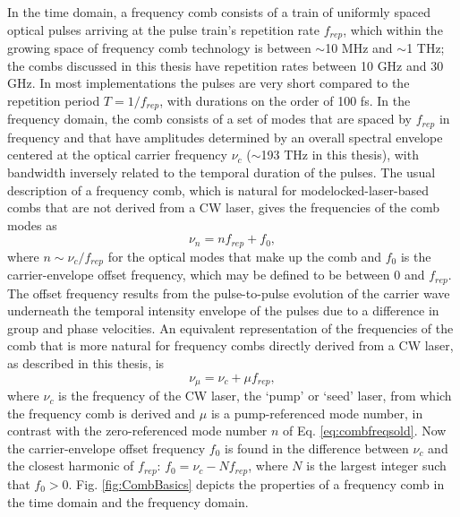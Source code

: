 In the time domain, a frequency comb consists of a train of uniformly spaced optical pulses arriving at the pulse train's repetition rate $f_{rep}$, which within the growing space of frequency comb technology is between $\sim$10 MHz and $\sim$1 THz; the combs discussed in this thesis have repetition rates between 10 GHz and 30 GHz. In most implementations the pulses are very short compared to the repetition period $T=1/f_{rep}$, with durations on the order of 100 fs. In the frequency domain, the comb consists of a set of modes that are spaced by $f_{rep}$ in frequency and that have amplitudes determined by an overall spectral envelope centered at the optical carrier frequency $\nu_c$ ($\sim$193 THz in this thesis), with bandwidth inversely related to the temporal duration of the pulses. The usual description of a frequency comb, which is natural for modelocked-laser-based combs that are not derived from a CW laser, gives the frequencies of the comb modes as 
\begin{equation}
\nu_n=nf_{rep}+f_0, \label{eq:combfreqsold}
\end{equation} 
where $n\sim \nu_c/f_{rep}$ for the optical modes that make up the comb and $f_0$ is the carrier-envelope offset frequency, which may be defined to be between $0$ and $f_{rep}$. The offset frequency results from the pulse-to-pulse evolution of the carrier wave underneath the temporal intensity envelope of the pulses due to a difference in group and phase velocities. An equivalent representation of the frequencies of the comb that is more natural for frequency combs directly derived from a CW laser, as described in this thesis, is
\begin{equation}
\nu_\mu=\nu_c+\mu f_{rep}, \label{eq:combfreqsnew}
\end{equation} 
where $\nu_c$ is the frequency of the CW laser, the `pump' or `seed' laser, from which the frequency comb is derived and $\mu$ is a pump-referenced mode number, in contrast with the zero-referenced mode number $n$ of Eq. \ref{eq:combfreqsold}. Now the carrier-envelope offset frequency $f_0$ is found in the difference between $\nu_c$ and the closest harmonic of $f_{rep}$: $f_0=\nu_c-N f_{rep}$, where $N$ is the largest integer such that $f_0>0$. Fig. \ref{fig:CombBasics} depicts the properties of a frequency comb in the time domain and the frequency domain.

